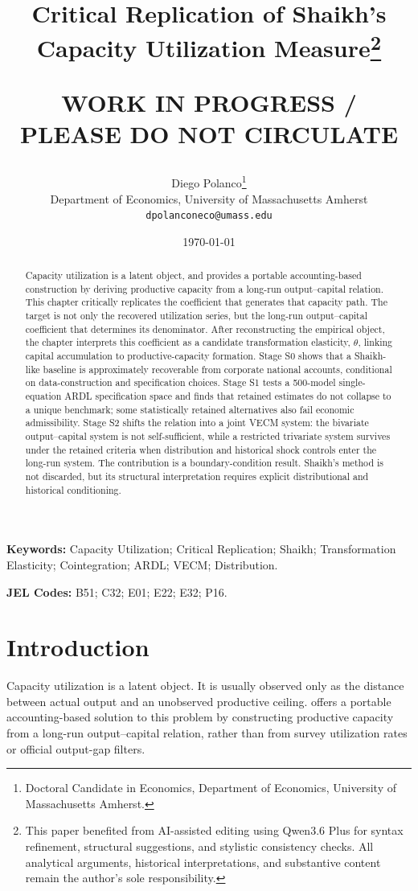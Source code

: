 \documentclass[11pt]{article}
\title{Critical Replication of Shaikh's Capacity Utilization Measure\thanks{This paper benefited from AI-assisted editing using Qwen3.6 Plus for syntax refinement, structural suggestions, and stylistic consistency checks. All analytical arguments, historical interpretations, and substantive content remain the author's sole responsibility.}\\
\begin{large}
\textbf{WORK IN PROGRESS / PLEASE DO NOT CIRCULATE}     
\end{large}
}
\author{Diego Polanco\thanks{Doctoral Candidate in Economics, Department of Economics, University of Massachusetts Amherst.}\\
Department of Economics, University of Massachusetts Amherst\\
\texttt{dpolanconeco@umass.edu}}
\date{\today}
\begin{document}
\maketitle


\begin{abstract}
Capacity utilization is a latent object, and \citet{Shaikh2016} provides a portable accounting-based construction by deriving productive capacity from a long-run output--capital relation. This chapter critically replicates the coefficient that generates that capacity path. The target is not only the recovered utilization series, but the long-run output--capital coefficient that determines its denominator. After reconstructing the empirical object, the chapter interprets this coefficient as a candidate transformation elasticity, $\theta$, linking capital accumulation to productive-capacity formation. Stage S0 shows that a Shaikh-like baseline is approximately recoverable from corporate national accounts, conditional on data-construction and specification choices. Stage S1 tests a 500-model single-equation ARDL specification space and finds that retained estimates do not collapse to a unique benchmark; some statistically retained alternatives also fail economic admissibility. Stage S2 shifts the relation into a joint VECM system: the bivariate output--capital system is not self-sufficient, while a restricted trivariate system survives under the retained criteria when distribution and historical shock controls enter the long-run system. The contribution is a boundary-condition result. Shaikh's method is not discarded, but its structural interpretation requires explicit distributional and historical conditioning.
\end{abstract}


\vspace{1cm}

\noindent\textbf{Keywords:} Capacity Utilization; Critical Replication; Shaikh; Transformation Elasticity; Cointegration; ARDL; VECM; Distribution.

\noindent\textbf{JEL Codes:} B51; C32; E01; E22; E32; P16.

\pagebreak
\section{Introduction}
\label{sec:introduction}

Capacity utilization is a latent object. It is usually observed only as the distance between actual output and an unobserved productive ceiling. \citet{Shaikh2016} offers a portable accounting-based solution to this problem by constructing productive capacity from a long-run output--capital relation, rather than from survey utilization rates or official output-gap filters.
\end{document}
